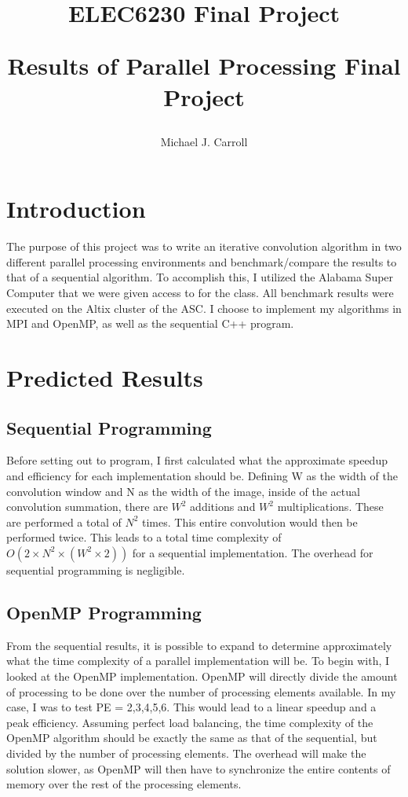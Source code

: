 \documentclass{article}
\title{ELEC6230 Final Project\\
{\large \begin{par}
Results of Parallel Processing Final Project
\end{par} \vspace{1em}
}}
\author{Michael J. Carroll}
\begin{document}
\maketitle

\section*{Introduction}
\begin{par}
The purpose of this project was to write an iterative convolution algorithm in two different parallel processing environments and benchmark/compare the results to that of a sequential algorithm.  To accomplish this, I utilized the Alabama Super Computer that we were given access to for the class.  All benchmark results were executed on the Altix cluster of the ASC.  I choose to implement my algorithms in MPI and OpenMP, as well as the sequential C++ program.
\end{par}

\section*{Predicted Results}
\subsection*{Sequential Programming}
\begin{par}
Before setting out to program, I first calculated what the approximate speedup and efficiency for each implementation should be.  Defining W as the width of the convolution window and N as the width of the image, inside of the actual convolution summation, there are $W^2$ additions and $W^2$ multiplications.  These are performed a total of $N^2$ times.  This entire convolution would then be performed twice. This leads to a total time complexity of $O(2 \times N^2 \times (W^2 \times 2))$ for a sequential implementation.  The overhead for sequential programming is negligible.
\end{par}

\subsection*{OpenMP Programming}
\begin{par}
From the sequential results, it is possible to expand to determine approximately what the time complexity of a parallel implementation will be.  To begin with, I looked at the OpenMP implementation.  OpenMP will directly divide the amount of processing to be done over the number of processing elements available.  In my case, I was to test PE = 2,3,4,5,6.  This would lead to a linear speedup and a peak efficiency.  Assuming perfect load balancing, the time complexity of the OpenMP algorithm should be exactly the same as that of the sequential, but divided by the number of processing elements.   The overhead will make the solution slower, as OpenMP will then have to synchronize the entire contents of memory over the rest of the processing elements.
\end{par}
\end{document}

